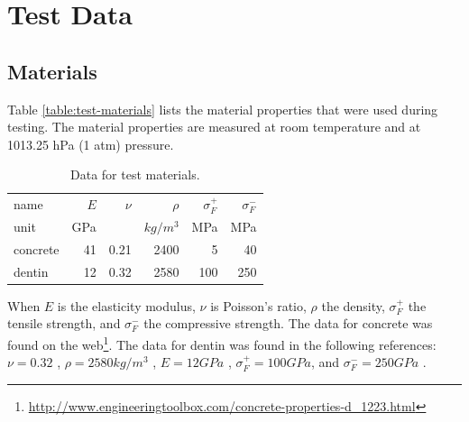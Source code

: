 
\chapter{Test Data}
\label{chapter:test_data}

\section{Materials}
\label{sec:test-materials}

Table \vref{table:test-materials} lists the material properties that
were used during testing. The material properties are measured at room
temperature and at 1013.25 hPa (1 atm) pressure.

\begin{table}
  \centering
  \begin{tabular}{| l | r | r | r | r | r |}
    \hline
    name     & $E$ & $\nu$ & $\rho$   & $\sigma_F^+$ & $\sigma_F^-$ \\
    unit     & GPa &       & $kg/m^3$ & MPa          & MPa \\
    \hline
    concrete &  41 &  0.21 &     2400 &            5 & 40 \\

     dentin & 12 &     0.32 & 2580 &  100 & 250 \\
    \hline
  \end{tabular}
  \caption{Data for test materials.}
  \label{table:test-materials}
\end{table}

When $E$ is the elasticity modulus, $\nu$ is Poisson's ratio, $\rho$
the density, $\sigma_F^+$ the tensile strength, and $\sigma_F^-$ the
compressive strength. The data for concrete was found on the
web\footnote{\url{http://www.engineeringtoolbox.com/concrete-properties-d_1223.html}}.
The data for dentin was found in the following references:
$\nu = 0.32$ ,
$\rho = 2580 kg/m^3$ ,
$E = 12 GPa$ ,
$\sigma_F^+ = 100 GPa$, and $\sigma_F^- = 250 GPa$
.

